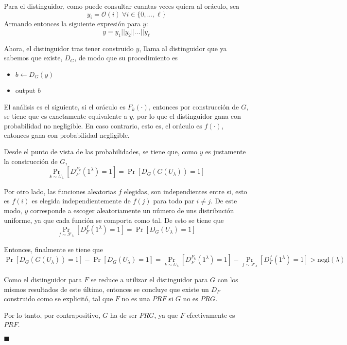 \documentclass[twoside]{tareas}
\begin{document}
Para el distinguidor, como puede consultar cuantas veces quiera al oráculo, sea
$$y_i = \mathcal{O}(i) \ \forall i \in \{0, ..., \ell\}$$
Armando entonces la siguiente expresión para $y$:
$$y = y_1||y_2||...||y_\ell$$

Ahora, el distinguidor tras tener construido $y$, llama al distinguidor que ya sabemos que existe, $D_G$, de modo que su procedimiento es
\begin{itemize}
    \item $b \leftarrow D_G(y)$
    \item output $b$
\end{itemize}

El análisis es el siguiente, si el oráculo es $F_k(\cdot)$, entonces por construcción de $G$, se tiene que es exactamente equivalente a $y$, por lo que el distinguidor gana con probabilidad no negligible. En caso contrario, esto es, el oráculo es $f(\cdot)$, entonces gana con probabilidad negligible.

Desde el punto de vista de las probabilidades, se tiene que, como $y$ es justamente la construcción de $G$,
$$\Pr_{k \sim U_\lambda}[D_F^{F_k}(1^\lambda) = 1] = \Pr[D_G(G(U_\lambda)) = 1]$$

Por otro lado, las funciones aleatorias $f$ elegidas, son independientes entre si, esto es $f(i)$ es elegida independientemente de $f(j)$ para todo par $i\neq j$. De este modo, $y$ corresponde a escoger aleatoriamente un número de uns distribución uniforme, ya que cada función se comporta como tal. De esto se tiene que
$$\Pr_{f \sim \mathcal{F}_\lambda}[D_F^{f}(1^\lambda) = 1] = \Pr[D_G(U_\lambda) = 1]$$

Entonces, finalmente se tiene que
$$\Pr[D_G(G(U_\lambda)) = 1] - \Pr[D_G(U_\lambda) = 1] = \Pr_{k \sim U_\lambda}[D_F^{F_k}(1^\lambda) = 1] - \Pr_{f \sim \mathcal{F}_\lambda}[D_F^{f}(1^\lambda) = 1] > \text{negl}(\lambda)$$

Como el distinguidor para $F$ se reduce a utilizar el distinguidor para $G$ con los mismos resultados de este último, entonces se concluye que existe un $D_F$ construido como se explicitó, tal que $F$ no es una $PRF$ si $G$ no es $PRG$.

Por lo tanto, por contrapositivo, $G$ ha de ser $PRG$, ya que $F$ efectivamente es $PRF$.
\begin{flushright} $\blacksquare$ \end{flushright}
\end{document}
